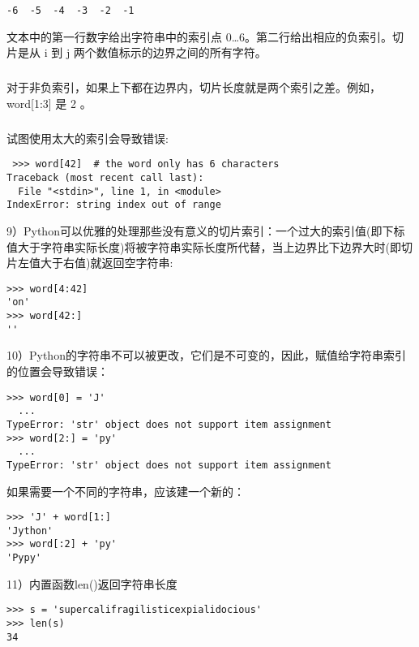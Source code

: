 \documentclass{article}
\begin{document}
\begin{CJK}{UTF8}{gbsn}
\begin{verbatim}
-6  -5  -4  -3  -2  -1
\end{verbatim}
文本中的第一行数字给出字符串中的索引点 0…6。第二行给出相应的负索引。切片是从 i 到 j 两个数值标示的边界之间的所有字符。
\subparagraph*{}
对于非负索引，如果上下都在边界内，切片长度就是两个索引之差。例如，word[1:3] 是 2 。
\subparagraph*{}
试图使用太大的索引会导致错误:
\begin{verbatim}
 >>> word[42]  # the word only has 6 characters
Traceback (most recent call last):
  File "<stdin>", line 1, in <module>
IndexError: string index out of range
\end{verbatim}
9）Python可以优雅的处理那些没有意义的切片索引：一个过大的索引值(即下标值大于字符串实际长度)将被字符串实际长度所代替，当上边界比下边界大时(即切片左值大于右值)就返回空字符串:
\begin{verbatim}
>>> word[4:42]
'on'
>>> word[42:]
''
\end{verbatim}
10）Python的字符串不可以被更改，它们是不可变的，因此，赋值给字符串索引的位置会导致错误：
\begin{verbatim}
>>> word[0] = 'J'
  ...
TypeError: 'str' object does not support item assignment
>>> word[2:] = 'py'
  ...
TypeError: 'str' object does not support item assignment
\end{verbatim}
如果需要一个不同的字符串，应该建一个新的：
\begin{verbatim}
>>> 'J' + word[1:]
'Jython'
>>> word[:2] + 'py'
'Pypy'
\end{verbatim}
11）内置函数len()返回字符串长度
\begin{verbatim}
>>> s = 'supercalifragilisticexpialidocious'
>>> len(s)
34
\end{verbatim}

\end{CJK}
\end{document}
